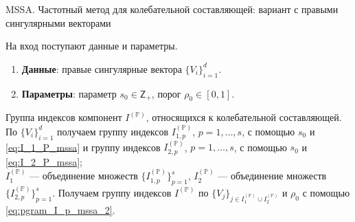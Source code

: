 \documentclass[specialist,
               substylefile = spbu.rtx,
               subf,href,colorlinks=true, 12pt]{disser}
\begin{document}
\begin{algorithm}[!hhh]
\caption{MSSA. Частотный метод для колебательной составляющей: вариант с правыми сингулярными векторами}
\label{alg:mssa_pgram_2}
\begin{algorithmic}[1]
\REQUIRE На вход поступают данные и параметры.
\begin{enumerate}
\item \textbf{Данные}: правые сингулярные вектора $\{V_i\}_{i=1}^{d}$.
\item \textbf{Параметры}: параметр $s_0 \in \mathsf{Z}_{+}$, порог $\rho_0 \in [0,1]$.
\end{enumerate}
\ENSURE Группа индексов компонент $I^{(\mathbb{P})}$, относящихся к колебательной составляющей.
\STATE  
По $\{V_i\}_{i=1}^{d}$ получаем группу индексов $I_{1,p}^{(\mathbb{P})}$, $p=1,\ldots,s$, с помощью $s_0$ и \eqref{eq:I_1_P_mssa} и группу индексов $I_{2,p}^{(\mathbb{P})}$, $p=1,\ldots,s$, с помощью $s_0$ и \eqref{eq:I_2_P_mssa};\\
$I_1^{(\mathbb{P})}$ --- объединение множеств $\{ I_{1,p}^{(\mathbb{P})} \}_{p=1}^{s}$, $I_2^{(\mathbb{P})}$ --- объединение множеств $\{ I_{2,p}^{(\mathbb{P})} \}_{p=1}^{s}$.
\STATE Получаем группу индексов $I^{(\mathbb{P})}$ по $\{V_j\}_{j \in I_1^{(\mathbb{P})} \cup I_2^{(\mathbb{P})}}$ и $\rho_0$ с помощью \eqref{eq:pgram_I_p_mssa_2}.
\end{algorithmic}
\end{algorithm}
\end{document}
